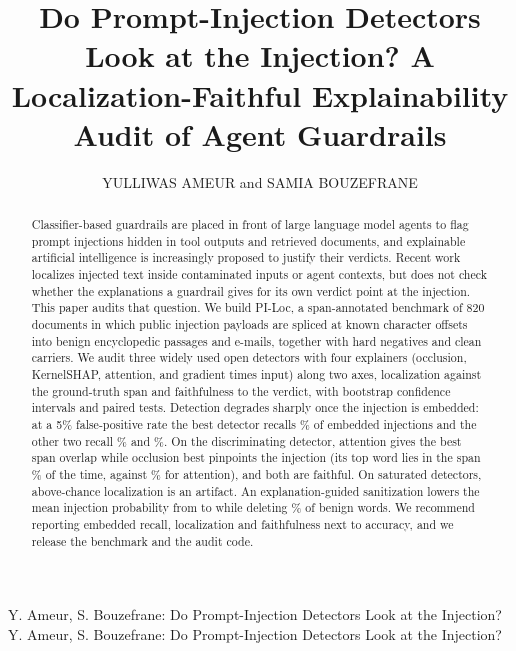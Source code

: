 \documentclass{ieeeaccess}
\begin{document}

\title{Do Prompt-Injection Detectors Look at the Injection? A Localization-Faithful Explainability Audit of Agent Guardrails}

\author{\uppercase{Yulliwas Ameur} and \uppercase{Samia Bouzefrane}}
\address[1]{Efrei Research Lab, Efrei Paris, Universit\'e Paris-Panth\'eon-Assas, 94800 Villejuif, France}
\address[2]{CEDRIC Laboratory, Conservatoire National des Arts et M\'etiers (Cnam), 75003 Paris, France}

\markboth
{Y. Ameur, S. Bouzefrane: Do Prompt-Injection Detectors Look at the Injection?}
{Y. Ameur, S. Bouzefrane: Do Prompt-Injection Detectors Look at the Injection?}


\begin{abstract}
Classifier-based guardrails are placed in front of large language model agents to flag prompt injections hidden in tool outputs and retrieved documents, and explainable artificial intelligence is increasingly proposed to justify their verdicts. Recent work localizes injected text inside contaminated inputs or agent contexts, but does not check whether the explanations a guardrail gives for its own verdict point at the injection. This paper audits that question. We build PI-Loc, a span-annotated benchmark of 820 documents in which public injection payloads are spliced at known character offsets into benign encyclopedic passages and e-mails, together with hard negatives and clean carriers. We audit three widely used open detectors with four explainers (occlusion, KernelSHAP, attention, and gradient times input) along two axes, localization against the ground-truth span and faithfulness to the verdict, with bootstrap confidence intervals and paired tests. Detection degrades sharply once the injection is embedded: at a 5\% false-positive rate the best detector recalls \PaTprCalPct\% of embedded injections and the other two recall \DsTprCalPct\% and \FmTprCalPct\%. On the discriminating detector, attention gives the best span overlap while occlusion best pinpoints the injection (its top word lies in the span \PaOccPgPct\% of the time, against \PaAttnPgPct\% for attention), and both are faithful. On saturated detectors, above-chance localization is an artifact. An explanation-guided sanitization lowers the mean injection probability from \SanAttnTwentyPb{} to \SanAttnTwentyPa{} while deleting \SanAttnTwentyCoPct\% of benign words. We recommend reporting embedded recall, localization and faithfulness next to accuracy, and we release the benchmark and the audit code.
\end{abstract}
\end{document}
